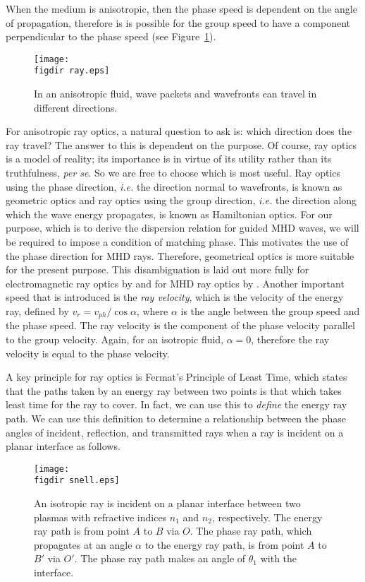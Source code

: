 \documentclass[12pt]{../style-files/ociamthesis}
\begin{document}
	When the medium is anisotropic, then the phase speed is dependent on the angle of propagation, therefore is is possible for the group speed to have a component perpendicular to the phase speed (see Figure~\ref{fig: anisotropic ray direction}).
	\begin{figure}
		\centering
		\texttt{[image: \\figdir ray.eps]}
		\caption{In an anisotropic fluid, wave packets and wavefronts can travel in different directions.}
		\label{fig: anisotropic ray direction}
	\end{figure}
	For anisotropic ray optics, a natural question to ask is: which direction does the ray travel? The answer to this is dependent on the purpose. Of course, ray optics is a model of reality; its importance is in virtue of its utility rather than its truthfulness, \textit{per se}. So we are free to choose which is most useful. Ray optics using the phase direction, \textit{i.e.} the direction normal to wavefronts, is known as geometric optics and ray optics using the group direction, \textit{i.e.} the direction along which the wave energy propagates, is known as Hamiltonian optics. For our purpose, which is to derive the dispersion relation for guided MHD waves, we will be required to impose a condition of matching phase. This motivates the use of the phase direction for MHD rays. Therefore, geometrical optics is more suitable for the present purpose. This disambiguation is laid out more fully for electromagnetic ray optics by \cite{has88} and for MHD ray optics by \cite{wal77}. Another important speed that is introduced is the \textit{ray velocity}, which is the velocity of the energy ray, defined by $v_r = v_{ph}/\cos{\alpha}$, where $\alpha$ is the angle between the group speed and the phase speed. The ray velocity is the component of the phase velocity parallel to the group velocity. Again, for an isotropic fluid, $\alpha = 0$, therefore the ray velocity is equal to the phase velocity.
	
	A key principle for ray optics is Fermat's Principle of Least Time, which states that the paths taken by an energy ray between two points is that which takes least time for the ray to cover. In fact, we can use this to \textit{define} the energy ray path. We can use this definition to determine a relationship between the phase angles of incident, reflection, and transmitted rays when a ray is incident on a planar interface as follows.
	
	\begin{figure}
		\centering
		\texttt{[image: \\figdir snell.eps]}
		\caption{An isotropic ray is incident on a planar interface between two plasmas with refractive indices $n_1$ and $n_2$, respectively. The energy ray path is from point $A$ to $B$ via $O$. The phase ray path, which propagates at an angle $\alpha$ to the energy ray path, is from point $A$ to $B'$ via $O'$. The phase ray path makes an angle of $\theta_1$ with the interface.}
		\label{fig: fermat}
	\end{figure}
	
\end{document}
